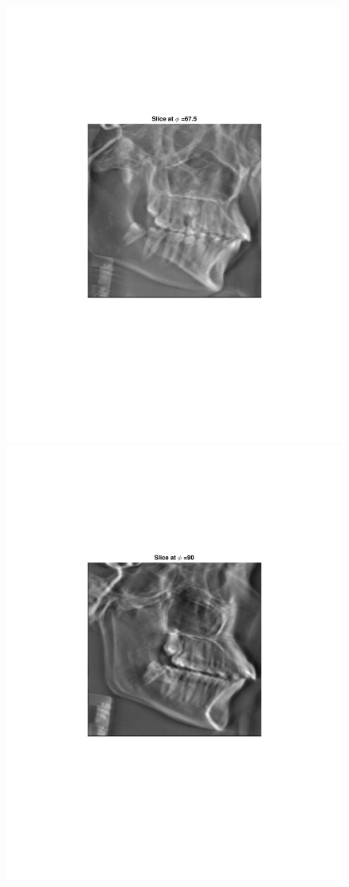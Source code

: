 \documentclass{UCF_ETD}
\begin{document}
\begin{figure}[H]
\begin{center}
\includegraphics[scale=0.5]{FVR/CompCT_2Slice68}
\includegraphics[scale=0.5]{FVR/CompCT_2Slice90}

\end{center}
\end{figure}
\end{document}

